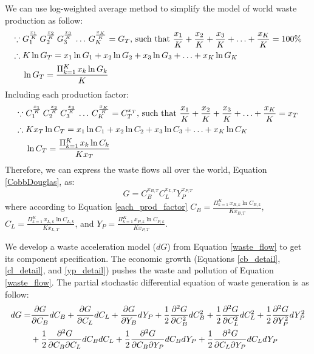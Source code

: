 \documentclass[sn-basic]{sn-jnl}%
\theoremstyle{thmstyleone}%
\theoremstyle{thmstyletwo}%
\theoremstyle{thmstylethree}%
\begin{document}
\begin{appendices}
	We can use log-weighted average method to simplify the model of world waste production as follow:
	\begin{align}
		\because \; & G_1^\frac{x_1}{K}\,G_2^\frac{x_2}{K}\,G_3^\frac{x_3}{K}\,\ldots\,G_K^\frac{x_K}{K}=G_T \text{, such that } 
		\frac{x_1}{K}+\frac{x_2}{K}+\frac{x_3}{K}+\ldots+\frac{x_K}{K}=100\%\notag\\
		\therefore \; & K \ln{G_T} = x_1 \ln{G_1} +x_2 \ln{G_2} +x_3 \ln{G_3} +\ldots+x_K \ln{G_K} \notag\\
		& \ln{G_T}=\frac{\Pi_{k=1}^K\,x_k\ln{G_k}}{K}
	\end{align}
	Including each production factor:
	\begin{align}
		\label{each_prod_factor}
		\because \; & C_1^\frac{x_1}{K}\,C_2^\frac{x_2}{K}\,C_3^\frac{x_3}{K}\,\ldots\,C_K^\frac{x_K}{K}=C_T^{x_T} \text{, such that } 
		\frac{x_1}{K}+\frac{x_2}{K}+\frac{x_3}{K}+\ldots+\frac{x_K}{K}=x_T\notag\\
		\therefore \; & Kx_T \ln{C_T} = x_1 \ln{C_1} +x_2 \ln{C_2} +x_3 \ln{C_3} +\ldots+x_K \ln{C_K} \notag\\	
		& \ln{C_T}=\frac{\Pi_{k=1}^K\,x_k\ln{C_k}}{Kx_T}
	\end{align}
	Therefore, we can express the waste flows all over the world, Equation \ref{CobbDouglas}, as:
	\begin{equation}
		\label{waste_flow}
		G=C_B^{x_{B,T}} C_L^{x_{L,T}} Y_P^{x_{P,T}} 
	\end{equation}
	where according to Equation \ref{each_prod_factor} $C_B=\frac{\Pi_{k=1}^K\,x_{B,k}\ln{C_{B,k}}}{Kx_{B,T}}$, $C_L=\frac{\Pi_{k=1}^K\,x_{L,k}\ln{C_{L,k}}}{Kx_{L,T}}$, and $Y_P=\frac{\Pi_{k=1}^K\,x_{P,k}\ln{C_{P,k}}}{Kx_{P,T}}$.
	
	We develop a waste acceleration model ($dG$) from Equation \ref{waste_flow} to get its component specification. The economic growth (Equations \ref{cb_detail}, \ref{cl_detail}, and \ref{yp_detail}) pushes the waste and pollution of Equation \ref{waste_flow}. The partial stochastic differential equation of waste generation is as follow:
	\begin{align}
		dG=&\frac{\partial G}{\partial C_B}dC_B + \frac{\partial G}{\partial C_L}dC_L + \frac{\partial G}{\partial Y_B}dY_P
		+ \frac{1}{2} \frac{\partial^2 G}{\partial C_B^2}dC_B^2 + \frac{1}{2} \frac{\partial^2 G}{\partial C_L^2}dC_L^2 + \frac{1}{2} \frac{\partial^2 G}{\partial Y_P^2}dY_P^2 \notag\\
		&+ \frac{1}{2} \frac{\partial^2 G}{\partial C_B\partial C_L}dC_BdC_L + \frac{1}{2} \frac{\partial^2 G}{\partial C_B\partial Y_P}dC_BdY_P + \frac{1}{2} \frac{\partial^2 G}{\partial C_L\partial Y_P}dC_LdY_P
	\end{align}


\end{appendices}
\end{document}
